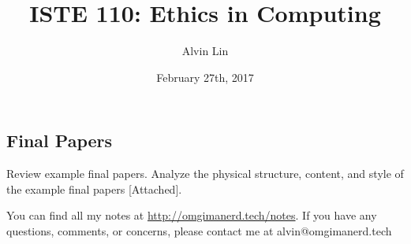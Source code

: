 \documentclass{article}
\title{ISTE 110: Ethics in Computing}
\author{Alvin Lin}
\date{February 27th, 2017}
\begin{document}
\maketitle

\subsection*{Final Papers}
Review example final papers. Analyze the physical structure, content, and style
of the example final papers [Attached].

\begin{center}
  You can find all my notes at \url{http://omgimanerd.tech/notes}. If you have
  any questions, comments, or concerns, please contact me at
  alvin@omgimanerd.tech
\end{center}
\end{document}
